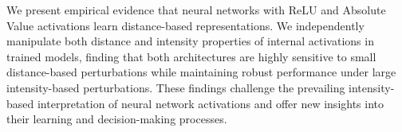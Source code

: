 We present empirical evidence that neural networks with ReLU and Absolute Value activations learn distance-based representations. We independently manipulate both distance and intensity properties of internal activations in trained models, finding that both architectures are highly sensitive to small distance-based perturbations while maintaining robust performance under large intensity-based perturbations. These findings challenge the prevailing intensity-based interpretation of neural network activations and offer new insights into their learning and decision-making processes.
